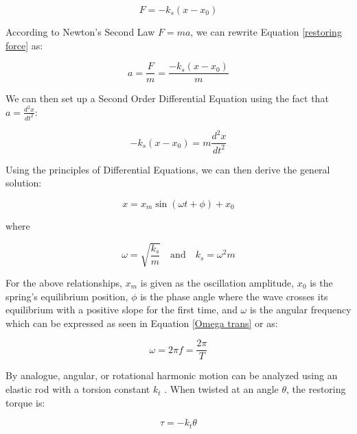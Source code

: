 \documentclass[12pt]{article}
\begin{document}
\begin{equation}
    F = -k_s(x-x_0) \label{restoring force}
\end{equation}

\noindent According to Newton's Second Law $F=ma$, we can rewrite Equation \ref{restoring force} as:

\begin{equation}
    a = \frac{F}{m}=\frac{-k_s(x-x_0)}{m} \label{N2L restoring}
\end{equation}

\noindent We can then set up a Second Order Differential Equation using the fact that $a=\frac{d^2x}{dt^2}$:

\begin{equation}
    -k_s(x-x_0) = m\frac{d^2x}{dt^2} \label{DE trans}
\end{equation}

\noindent Using the principles of Differential Equations, we can then derive the general solution:

\begin{equation}
    x=x_m\sin(\omega t+\phi)+x_0 \label{trans general sol}
\end{equation}

\noindent where

\begin{equation}
    \omega=\sqrt{\frac{k_s}{m}} \quad\text{and}\quad k_s = \omega^2m\label{Omega trans}
\end{equation}

For the above relationships, $x_m$ is given as the oscillation amplitude, $x_0$ is the spring's equilibrium position,  $\phi$ is the phase angle where the wave crosses its equilibrium with a positive slope for the first time, and $\omega$ is the angular frequency which can be expressed as seen in Equation \ref{Omega trans} or as:

\begin{equation}
     \omega=2\pi f=\frac{2\pi}{T} \label{omega freq}
\end{equation}

By analogue, angular, or rotational harmonic motion can be analyzed using an elastic rod with a torsion constant $k_t$ . When twisted at an angle $\theta$, the restoring torque is:

\begin{equation}
    \tau = -k_t\theta \label{restoring torque}
\end{equation}
\end{document}
